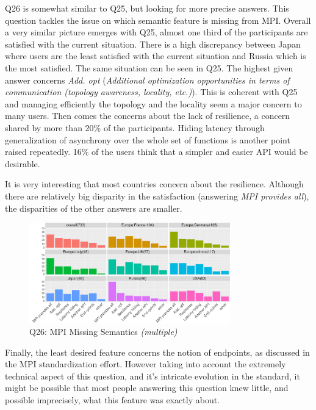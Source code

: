 \documentclass[preprint,5p,times]{elsarticle}
\def\myquote#1{{\it #1}}
\begin{document}
Q26 is somewhat similar to Q25, but looking for more precise answers.
This question tackles the issue on which semantic feature is missing
from MPI. Overall a very similar picture emerges with Q25, almost one
third of the participants are satisfied with the current
situation. There is a high discrepancy between Japan where users are
the least satisfied with the current situation and Russia which is
the most satisfied. The same situation can be seen in Q25. The highest
given answer concerns \myquote{Add. opt} (\myquote{Additional
  optimization opportunities in terms of communication (topology
  awareness, locality, etc.)}). This is coherent with Q25 and managing
efficiently the topology and the locality seem a major concern to many
users. Then
comes the concerns about the lack of resilience, a concern shared by
more than 20\% of the participants. Hiding latency through
generalization of asynchrony over the whole set of functions is
another point raised repeatedly. 16\% of the users think that a
simpler and easier API would be desirable.

It is very interesting that most countries concern about the
resilience. Although there are relatively big
disparity in the satisfaction (answering \myquote{MPI provides all}),
the disparities of the other answers are smaller.

\begin{figure}[htb]
\begin{center}
\includegraphics[width=8.7cm]{R-scripts/Q26.pdf}
\caption{Q26: MPI Missing Semantics {\it(multiple)}}
\label{fig:missing-semantics}
\end{center}
\end{figure}

Finally, the least desired feature concerns the notion of endpoints,
as discussed in the MPI standardization effort. However taking into
account the extremely
technical aspect of this question, and it's intricate evolution in the
standard, it might be possible that most people answering this
question knew little, and possible imprecisely, what this feature was
exactly about.
\end{document}
